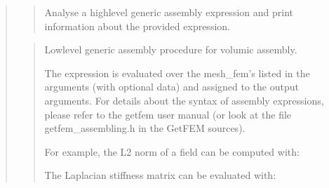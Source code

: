 \documentclass[a4paper,11pt,english]{sphinxmanual}
\begin{document}
\begin{quote}
\begin{quote}

Analyse a high\sphinxhyphen{}level generic assembly expression and print
information about the provided expression.
\end{quote}

\begin{quote}

Low\sphinxhyphen{}level generic assembly procedure for volumic assembly.

The expression  is evaluated over the mesh\_fem’s listed in the
arguments (with optional data) and assigned to the output arguments.
For details about the syntax of assembly expressions, please refer
to the getfem user manual (or look at the file getfem\_assembling.h
in the GetFEM sources).

For example, the L2 norm of a field can be computed with:

\begin{sphinxVerbatim}[commandchars=\\\{\}]
      

\end{sphinxVerbatim}

The Laplacian stiffness matrix can be evaluated with:

\begin{sphinxVerbatim}[commandchars=\\\{\}]
      


\end{sphinxVerbatim}
\end{quote}
\end{quote}
\end{document}
